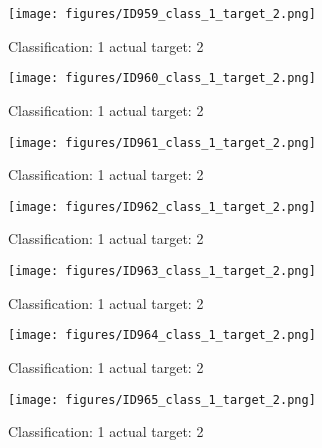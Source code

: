 \begin{figure}[h!]
\begin{center}
\texttt{[image: figures/ID959\_class\_1\_target\_2.png]}
\end{center}
\caption{ Classification: 1 actual target: 2}
\label{fig:ID959_class_1_target_2}
\end{figure}
\begin{figure}[h!]
\begin{center}
\texttt{[image: figures/ID960\_class\_1\_target\_2.png]}
\end{center}
\caption{ Classification: 1 actual target: 2}
\label{fig:ID960_class_1_target_2}
\end{figure}
\begin{figure}[h!]
\begin{center}
\texttt{[image: figures/ID961\_class\_1\_target\_2.png]}
\end{center}
\caption{ Classification: 1 actual target: 2}
\label{fig:ID961_class_1_target_2}
\end{figure}
\begin{figure}[h!]
\begin{center}
\texttt{[image: figures/ID962\_class\_1\_target\_2.png]}
\end{center}
\caption{ Classification: 1 actual target: 2}
\label{fig:ID962_class_1_target_2}
\end{figure}
\begin{figure}[h!]
\begin{center}
\texttt{[image: figures/ID963\_class\_1\_target\_2.png]}
\end{center}
\caption{ Classification: 1 actual target: 2}
\label{fig:ID963_class_1_target_2}
\end{figure}
\begin{figure}[h!]
\begin{center}
\texttt{[image: figures/ID964\_class\_1\_target\_2.png]}
\end{center}
\caption{ Classification: 1 actual target: 2}
\label{fig:ID964_class_1_target_2}
\end{figure}
\begin{figure}[h!]
\begin{center}
\texttt{[image: figures/ID965\_class\_1\_target\_2.png]}
\end{center}
\caption{ Classification: 1 actual target: 2}
\label{fig:ID965_class_1_target_2}
\end{figure}
